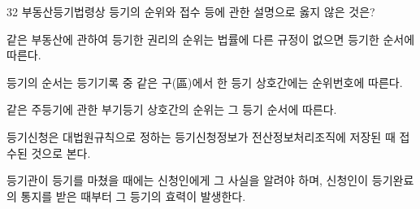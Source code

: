 \begin{question}{32}
부동산등기법령상 등기의 순위와 접수 등에 관한 설명으로 옳지 않은 것은?
\begin{choices}
  \item 같은 부동산에 관하여 등기한 권리의 순위는 법률에 다른 규정이 없으면 등기한 순서에 따른다.
  \item 등기의 순서는 등기기록 중 같은 구(區)에서 한 등기 상호간에는 순위번호에 따른다.
  \item 같은 주등기에 관한 부기등기 상호간의 순위는 그 등기 순서에 따른다.
  \item 등기신청은 대법원규칙으로 정하는 등기신청정보가 전산정보처리조직에 저장된 때 접수된 것으로 본다.
  \item 등기관이 등기를 마쳤을 때에는 신청인에게 그 사실을 알려야 하며, 신청인이 등기완료의 통지를 받은 때부터 그 등기의 효력이 발생한다.
\end{choices}
\end{question}
